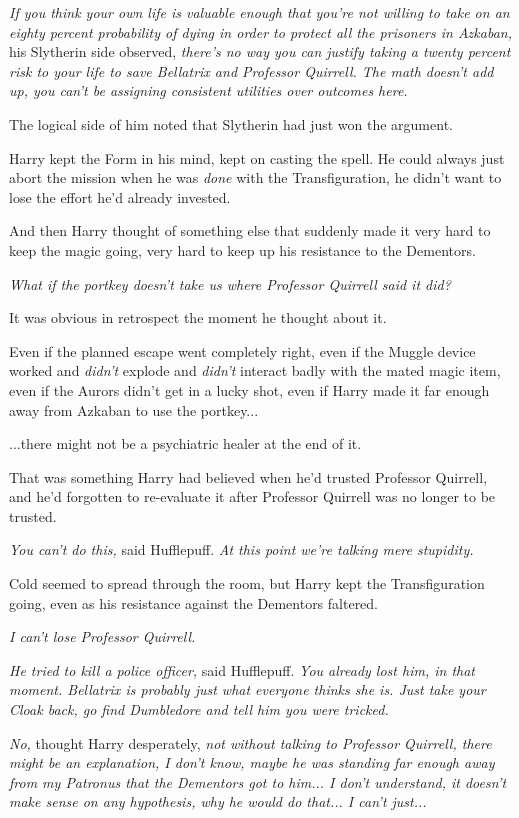 \emph{If you think your own life is valuable enough that you’re not willing to take on an eighty percent probability of dying in order to protect all the prisoners in Azkaban,} his Slytherin side observed, \emph{there’s no way you can justify taking a twenty percent risk to your life to save Bellatrix and Professor Quirrell. The math doesn’t add up, you can’t be assigning consistent utilities over outcomes here.}

The logical side of him noted that Slytherin had just won the argument.

Harry kept the Form in his mind, kept on casting the spell. He could always just abort the mission when he was \emph{done} with the Transfiguration, he didn’t want to lose the effort he’d already invested.

And then Harry thought of something else that suddenly made it very hard to keep the magic going, very hard to keep up his resistance to the Dementors.

\emph{What if the portkey doesn’t take us where Professor Quirrell said it did?}

It was obvious in retrospect the moment he thought about it.

Even if the planned escape went completely right, even if the Muggle device worked and \emph{didn’t} explode and \emph{didn’t} interact badly with the mated magic item, even if the Aurors didn’t get in a lucky shot, even if Harry made it far enough away from Azkaban to use the portkey...

...there might not be a psychiatric healer at the end of it.

That was something Harry had believed when he’d trusted Professor Quirrell, and he’d forgotten to re-evaluate it after Professor Quirrell was no longer to be trusted.

\emph{You can’t do this,} said Hufflepuff. \emph{ At this point we’re talking mere stupidity.}

Cold seemed to spread through the room, but Harry kept the Transfiguration going, even as his resistance against the Dementors faltered.

\emph{I can’t lose Professor Quirrell.}

\emph{He tried to kill a police officer,} said Hufflepuff. \emph{You already lost him, in that moment. Bellatrix is probably just what everyone thinks she is. Just take your Cloak back, go find Dumbledore and tell him you were tricked.}

\emph{No,} thought Harry desperately, \emph{not without talking to Professor Quirrell, there might be an explanation, I don’t know, maybe he was standing far enough away from my Patronus that the Dementors got to him... I don’t understand, it doesn’t make sense on any hypothesis, why he would do that... I can’t just...\\}

